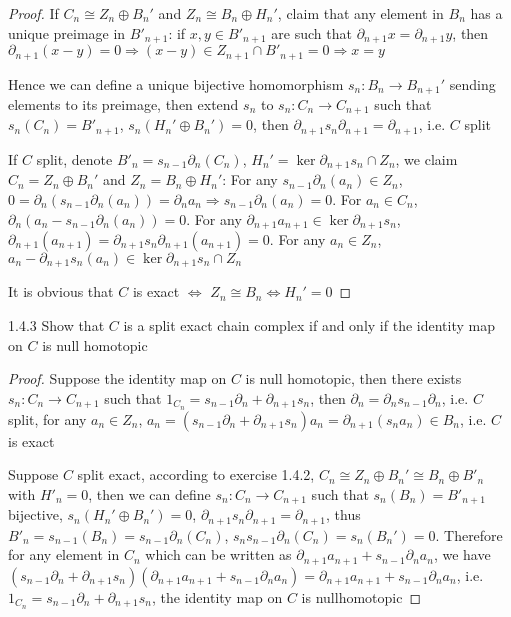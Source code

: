 \documentclass[../main.tex]{subfiles}
\begin{document}
\begin{proof}
If $C_n\cong Z_n\oplus B_n'$ and $Z_n\cong B_n\oplus H_n'$, claim that any element in $B_n$ has a unique preimage in $B'_{n+1}$: if $x,y\in B'_{n+1}$ are such that $\partial_{n+1}x=\partial_{n+1}y$, then $\partial_{n+1}(x-y)=0\Rightarrow (x-y)\in Z_{n+1}\cap B'_{n+1}=0\Rightarrow x=y$ \par
Hence we can define a unique bijective homomorphism $s_n:B_n\to B_{n+1}'$ sending elements to its preimage, then extend $s_n$ to $s_n:C_n\to C_{n+1}$ such that $s_n(C_n)= B'_{n+1}$, $s_{n}(H_n'\oplus B_n')=0$, then $\partial_{n+1}s_n\partial_{n+1}=\partial_{n+1}$, i.e. $C$ split \par
If $C$ split, denote $B'_n=s_{n-1}\partial_n(C_n)$, $H_n'=\ker \partial_{n+1}s_n\cap Z_n$, we claim $C_n= Z_n\oplus B_n'$ and $Z_n=B_n\oplus H_n'$: For any $s_{n-1}\partial_n(a_n)\in Z_n$, $0=\partial_n(s_{n-1}\partial_n(a_n))=\partial_na_n\Rightarrow s_{n-1}\partial_n(a_n)=0$. For $a_n\in C_n$, $\partial_n(a_n-s_{n-1}\partial_n(a_n))=0$. For any $\partial_{n+1}a_{n+1}\in\ker \partial_{n+1}s_n$, $\partial_{n+1}(a_{n+1})=\partial_{n+1}s_n\partial_{n+1}(a_{n+1})=0$. For any $a_n\in Z_n$, $a_n-\partial_{n+1}s_n(a_n)\in\ker \partial_{n+1}s_n\cap Z_n$ \par
It is obvious that $C$ is exact $\Leftrightarrow$ $Z_n\cong B_n\Leftrightarrow H_n'=0$
\end{proof}

\begin{customexercise}{1.4.3}
Show that $C$ is a split exact chain complex if and only if the identity map on $C$ is null homotopic 
\end{customexercise}

\begin{proof}
Suppose the identity map on $C$ is null homotopic, then there exists $s_n:C_n\to C_{n+1}$ such that $1_{C_n}=s_{n-1}\partial_n+\partial_{n+1}s_n$, then $\partial_n=\partial_ns_{n-1}\partial_n$, i.e. $C$ split, for any $a_n\in Z_n$, $a_n=(s_{n-1}\partial_n+\partial_{n+1}s_n)a_n=\partial_{n+1}(s_na_n)\in B_n$, i.e. $C$ is exact \par
Suppose $C$ split exact, according to exercise 1.4.2, $C_n\cong Z_n\oplus B_n'\cong B_n\oplus B'_n$ with $H'_n=0$, then we can define $s_n:C_n\to C_{n+1}$ such that $s_n(B_n)= B'_{n+1}$ bijective, $s_{n}(H_n'\oplus B_n')=0$, $\partial_{n+1}s_n\partial_{n+1}=\partial_{n+1}$, thus $B'_n=s_{n-1}(B_n)=s_{n-1}\partial_n(C_n)$, $s_ns_{n-1}\partial_n(C_n)=s_n(B_n')=0$. Therefore for any element in $C_n$ which can be written as $\partial_{n+1}a_{n+1}+s_{n-1}\partial_na_n$, we have $(s_{n-1}\partial_n+\partial_{n+1}s_n)(\partial_{n+1}a_{n+1}+s_{n-1}\partial_na_n)=\partial_{n+1}a_{n+1}+s_{n-1}\partial_na_n$, i.e. $1_{C_n}=s_{n-1}\partial_n+\partial_{n+1}s_n$, the identity map on $C$ is nullhomotopic
\end{proof}
\end{document}
